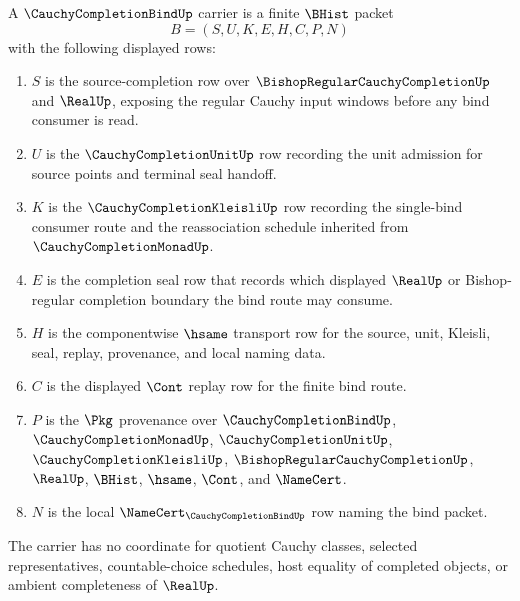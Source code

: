 \begin{definition}
\label{def:cauchy-completion-bind-carrier}
A $\CauchyCompletionBindUp$ carrier is a finite $\BHist$ packet
$$
B=(S,U,K,E,H,C,P,N)
$$
with the following displayed rows:
\begin{enumerate}
\item $S$ is the source-completion row over $\BishopRegularCauchyCompletionUp$ and $\RealUp$, exposing the regular Cauchy input windows before any bind consumer is read.
\item $U$ is the $\CauchyCompletionUnitUp$ row recording the unit admission for source points and terminal seal handoff.
\item $K$ is the $\CauchyCompletionKleisliUp$ row recording the single-bind consumer route and the reassociation schedule inherited from $\CauchyCompletionMonadUp$.
\item $E$ is the completion seal row that records which displayed $\RealUp$ or Bishop-regular completion boundary the bind route may consume.
\item $H$ is the componentwise $\hsame$ transport row for the source, unit, Kleisli, seal, replay, provenance, and local naming data.
\item $C$ is the displayed $\Cont$ replay row for the finite bind route.
\item $P$ is the $\Pkg$ provenance over $\CauchyCompletionBindUp$, $\CauchyCompletionMonadUp$, $\CauchyCompletionUnitUp$, $\CauchyCompletionKleisliUp$, $\BishopRegularCauchyCompletionUp$, $\RealUp$, $\BHist$, $\hsame$, $\Cont$, and $\NameCert$.
\item $N$ is the local $\NameCert_{\CauchyCompletionBindUp}$ row naming the bind packet.
\end{enumerate}
The carrier has no coordinate for quotient Cauchy classes, selected representatives, countable-choice schedules, host equality of completed objects, or ambient completeness of $\RealUp$.
\end{definition}


